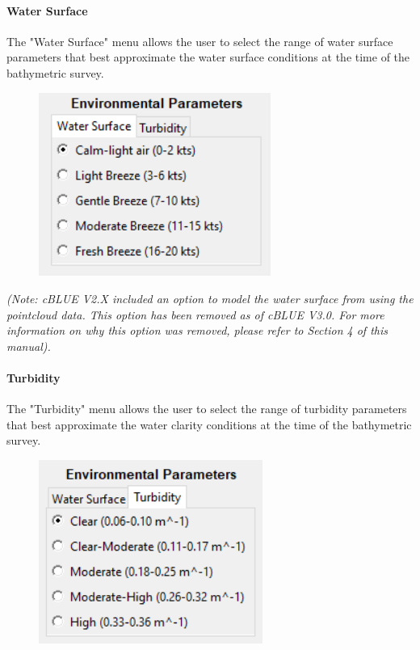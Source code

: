 \documentclass[11pt, a4paper]{article}
\begin{document}
\paragraph{Water Surface}
The "Water Surface" menu allows the user to select the range of water surface parameters that best approximate the water surface conditions at the time of the bathymetric survey.

\begin{figure}[H]
    \centering
    \includegraphics[height=6cm]{figs/cblue_wind_speed_gui.png}
\end{figure}

\vspace{1em}

\textit{(Note: cBLUE V2.X included an option to model the water surface from using the pointcloud data. This option has been removed as of cBLUE V3.0. For more information on why this option was removed, please refer to Section 4 of this manual).}

\paragraph{Turbidity}
The "Turbidity" menu allows the user to select the range of turbidity parameters that best approximate the water clarity conditions at the time of the bathymetric survey.

\begin{figure}[H]
    \centering
    \includegraphics[height=6cm]{figs/cblue_turbidity_gui.png}
\end{figure}
\end{document}

